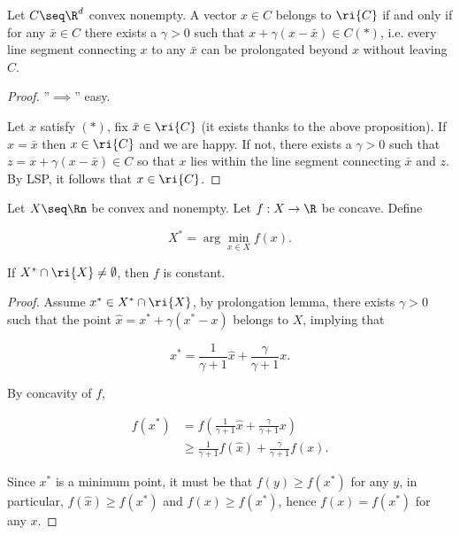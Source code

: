 \begin{lemma}

    Let $C \seq \R^d$ convex nonempty. A vector $x \in C$ belongs to $\ri{C}$ if and only if for any $\bar{x} \in C$ there exists a $\gamma > 0$ such that $x + \gamma(x - \bar{x}) \in C (*)$, i.e. every line segment connecting $x$ to any $\bar{x}$ can be prolongated beyond $x$ without leaving $C$.
    
\end{lemma}

\begin{proof}
    
    ''$\implies$'' easy. 

    Let $x$ satisfy $(*)$, fix $\bar{x} \in \ri{C}$ (it exists thanks to the above proposition). If $x = \bar{x}$ then $x \in \ri{C}$ and we are happy. If not, there exists a $\gamma > 0$ such that $z = x + \gamma(x-\bar{x}) \in C$ so that $x$ lies within the line segment connecting $\bar{x}$ and $z$. By LSP, it follows that $x \in \ri{C}$.

\end{proof}

\begin{proposition}
    
    Let $X \seq \Rn$ be convex and nonempty. Let $f : X \to \R$ be concave. Define 

    \[ X^* = \arg\min_{x \in X} f(x). \]

    If $X^* \cap \ri{X} \neq \emptyset$, then $f$ is constant.

\end{proposition}

\begin{proof}
    
    Assume $x^* \in X^* \cap \ri{X}$, by prolongation lemma, there exists $\gamma > 0$ such that the point $\hat{x} = x^* +\gamma(x^* - x)$ belongs to $X$, implying that

    \[ x^* = \frac{1}{\gamma + 1}\hat{x} + \frac{\gamma}{\gamma + 1}x. \]

    By concavity of $f$, 

    \begin{align*}
        f(x^*) &= f(\frac{1}{\gamma + 1}\hat{x} + \frac{\gamma}{\gamma + 1}x) \\ 
            &\ge \frac{1}{\gamma+1} f(\hat{x}) + \frac{\gamma}{\gamma+1}f(x). 
    \end{align*}

    Since $x^*$ is a minimum point, it must be that $f(y) \ge f(x^*)$ for any $y$, in particular, $f(\hat{x}) \ge f(x^*)$ and $f(x) \ge f(x^*)$, hence $f(x) = f(x^*)$ for any $x$.

\end{proof}

